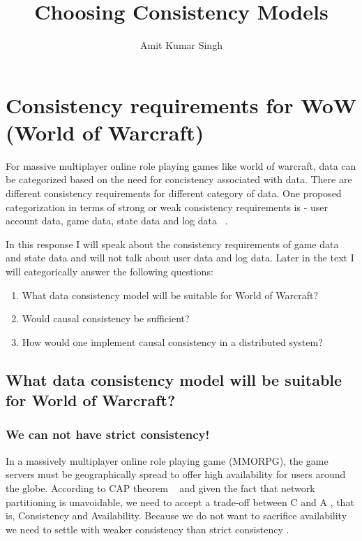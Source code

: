 \documentclass[11pt]{article} %
\title{Choosing Consistency Models}
\author{Amit Kumar Singh}
\begin{document}
\maketitle

\section{Consistency requirements for WoW (World of Warcraft)}

For massive multiplayer online role playing games like world of warcraft, data can be categorized based on the need for concistency associated with data. There are different consistency requirements for different category of data. One proposed categorization in terms of strong or weak consistency requirements is - user account data, game data, state data and log data ~\cite{diao2013consistency}. 

In this response I will speak about the consistency requirements of game data and state data and will not talk about user data and log data. Later in the text I will categorically answer the following questions:

\begin{enumerate}
	\item What data consistency model will be suitable for World of Warcraft?
	\item Would causal consistency be sufficient?
	\item How would one implement causal consistency in a distributed system?
\end{enumerate}

\subsection{What data consistency model will be suitable for World of Warcraft?}
\subsubsection{We can not have strict consistency!}
In a massively multiplayer online role playing game (MMORPG), the game servers must be geographically spread to offer high availability for users around the globe. According to CAP theorem ~\cite{Brewer:2000:TRD:343477.343502} and given the fact that network partitioning is unavoidable, we need to accept a trade-off between C and A , that is, Consistency and Availability. Because we do not want to sacrifice availability we need to settle with weaker consistency than strict consistency \cite{nitzberg1991distributed}.
\end{document}
